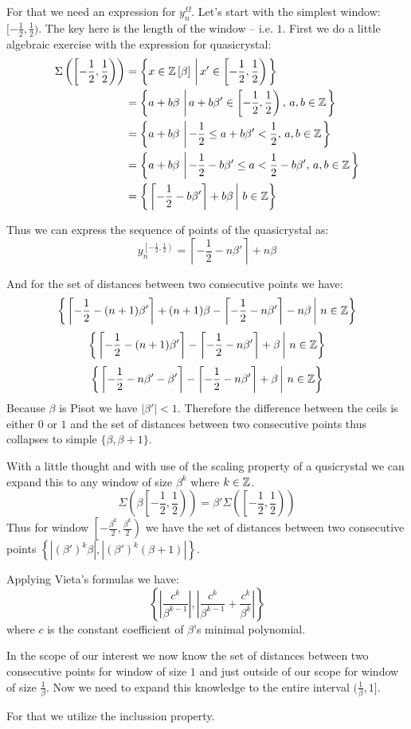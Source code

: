 \documentclass[text.tex]{subfiles}
\begin{document}
For that we need an expression for $y^\Omega_n$. Let's start with the simplest window: $[-\frac{1}{2}, \frac{1}{2})$. The key here is the length of the window -- i.e. $1$. First we do a little algebraic exercise with the expression for quasicrystal:
\begin{align*}
\Sigma\left(\left[-\frac{1}{2}, \frac{1}{2}\right)\right) &= \left\{x\in\mathbb{Z}\left[\beta\right]\,\left|\, x'\in \left[-\frac{1}{2}, \frac{1}{2}\right)\right.\right\}\\
  &= \left\{a+b\beta\,\left|\, a+b\beta'\in \left[-\frac{1}{2}, \frac{1}{2}\right),\,a,b\in\mathbb{Z}\right.\right\}\\
  &= \left\{a+b\beta\,\left|\, -\frac{1}{2}\leq a+b\beta'<\frac{1}{2},\,a,b\in\mathbb{Z}\right.\right\}\\
  &= \left\{a+b\beta\,\left|\, -\frac{1}{2}-b\beta'\leq a < \frac{1}{2}-b\beta',\,a,b\in\mathbb{Z}\right.\right\}\\
  &= \left\{\left.\left\lceil-\frac{1}{2} -b\beta'\right\rceil + b\beta\,\right|\, b\in\mathbb{Z}\right\}\\
\end{align*}

Thus we can express the sequence of points of the quasicrystal as:
$$y^{\left[-\frac{1}{2}, \frac{1}{2}\right)}_n = \left\lceil-\frac{1}{2} -n\beta'\right\rceil + n\beta$$

And for the set of distances between two consecutive points we have:
$$\left\{ \left.\left\lceil-\frac{1}{2} -(n+1)\beta'\right\rceil + (n+1)\beta - \left\lceil-\frac{1}{2} -n\beta'\right\rceil - n\beta \,\right|\, n\in\mathbb{Z}\right\}$$
$$\left\{ \left.\left\lceil-\frac{1}{2} -(n+1)\beta'\right\rceil - \left\lceil-\frac{1}{2} -n\beta'\right\rceil + \beta \,\right|\, n\in\mathbb{Z}\right\}$$
$$\left\{ \left.\left\lceil-\frac{1}{2} -n\beta' - \beta'\right\rceil - \left\lceil-\frac{1}{2} -n\beta'\right\rceil + \beta \,\right|\, n\in\mathbb{Z}\right\}$$
Because $\beta$ is Pisot we have $|\beta'|<1$. Therefore the difference between the ceils is either $0$ or $1$ and the set of distances between two consecutive points thus collapses to simple $\{\beta, \beta + 1\}$. 

With a little thought and with use of the scaling property of a qusicrystal we can expand this to any window of size $\beta^k$ where $k\in\mathbb{Z}$. 
$$\Sigma\left(\beta\left[-\frac{1}{2}, \frac{1}{2}\right)\right) = \beta'\Sigma\left(\left[-\frac{1}{2}, \frac{1}{2}\right)\right)$$
Thus for window $\left[-\frac{\beta^k}{2}, \frac{\beta^k}{2}\right)$ we have the set of distances between two consecutive points $\left\{\left|(\beta')^k\beta\right|, \left|(\beta')^k(\beta + 1)\right|\right\}$. 

Applying Vieta's formulas we have:
$$\left\{\left|\frac{c^k}{\beta^{k-1}}\right|, \left|\frac{c^k}{\beta^{k-1}}+\frac{c^k}{\beta^{k}}\right|\right\}$$
where $c$ is the constant coefficient of $\beta$'s minimal polynomial. 

In the scope of our interest we now know the set of distances between two consecutive points for window of size $1$ and just outside of our scope for window of size $\frac{1}{\beta}$. Now we need to expand this knowledge to the entire interval $(\frac{1}{\beta},1]$. 

For that we utilize the inclussion property. 
\end{document}
